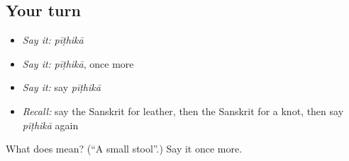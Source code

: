 \subsection*{Your turn}
\begin{itemize}
\raggedright
  \item \emph{Say it:} \emph{pīṭhikā}
  \item \emph{Say it:} \emph{pīṭhikā}, once more
  \item \emph{Say it:} say \emph{pīṭhikā}
  \item \emph{Recall:} say the Sanskrit for leather, then the Sanskrit for a knot, then say \emph{pīṭhikā} again
\end{itemize}

\begin{tcolorbox}[breakable,colback=teal!4,colframe=teal!35!black,title={Before you move on}]
What does  mean? (\textquotedblleft{}A small stool\textquotedblright{}.) Say it once more.
\end{tcolorbox}
